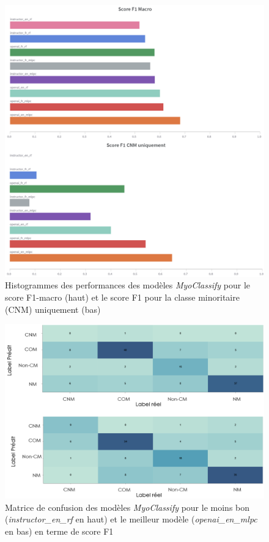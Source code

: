 \begin{figure}[htbp]
 \centering
 \includegraphics[width=1\textwidth]{figures/histo_myoclassify.png}
 \caption[Histogrammes des performances des modèle \textit{MyoClassify}]{Histogrammes des performances des modèles \textit{MyoClassify} pour le score F1-macro (haut) et le score F1 pour la classe minoritaire (CNM) uniquement (bas)}
 \label{fig:myoclassify_histo}
\end{figure}
\begin{figure}[htbp]
 \centering
 \includegraphics[width=1\textwidth]{figures/matrix_conf_myoclassify.png}
 \caption[Matrice de confusion \textit{MyoClassify}]{Matrice de confusion des modèles \textit{MyoClassify} pour le moins bon (\textit{instructor\_en\_rf} en haut) et le meilleur modèle (\textit{openai\_en\_mlpc} en bas) en terme de score F1}
 \label{fig:myoclassify_conf}
\end{figure}

